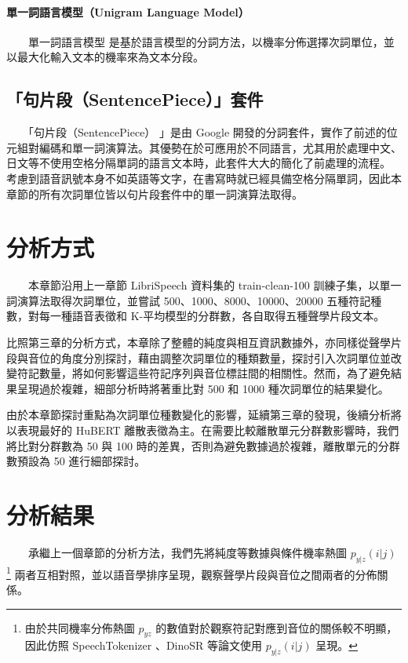 \paragraph{單一詞語言模型（Unigram Language Model）} \hfill \break
%
　　單一詞語言模型 \cite{kudo2018subword} 是基於語言模型的分詞方法，以機率分佈選擇次詞單位，並以最大化輸入文本的機率來為文本分段。

\subsection{「句片段（SentencePiece）」套件}

　　「句片段（SentencePiece） \cite{kudo_sentencepiece_2018}
」是由 Google 開發的分詞套件，實作了前述的位元組對編碼和單一詞演算法。其優勢在於可應用於不同語言，尤其用於處理中文、日文等不使用空格分隔單詞的語言文本時，此套件大大的簡化了前處理的流程。
        考慮到語音訊號本身不如英語等文字，在書寫時就已經具備空格分隔單詞，因此本章節的所有次詞單位皆以句片段套件中的單一詞演算法取得。

\section{分析方式}

　　本章節沿用上一章節 LibriSpeech 資料集的 train-clean-100 訓練子集，以單一詞演算法取得次詞單位，並嘗試 500、1000、8000、10000、20000 五種符記種數，對每一種語音表徵和 K-平均模型的分群數，各自取得五種聲學片段文本。

        比照第三章的分析方式，本章除了整體的純度與相互資訊數據外，亦同樣從聲學片段與音位的角度分別探討，藉由調整次詞單位的種類數量，探討引入次詞單位並改變符記數量，將如何影響這些符記序列與音位標註間的相關性。然而，為了避免結果呈現過於複雜，細部分析時將著重比對 500 和 1000 種次詞單位的結果變化。

        由於本章節探討重點為次詞單位種數變化的影響，延續第三章的發現，後續分析將以表現最好的 HuBERT 離散表徵為主。在需要比較離散單元分群數影響時，我們將比對分群數為 50 與 100 時的差異，否則為避免數據過於複雜，離散單元的分群數預設為 50 進行細部探討。

\section{分析結果} 

　　承繼上一個章節的分析方法，我們先將純度等數據與條件機率熱圖 $p_{y|z}(i | j)$ \footnote{由於共同機率分佈熱圖 $p_{yz}$ 的數值對於觀察符記對應到音位的關係較不明顯，因此仿照 SpeechTokenizer \cite{zhang2024speechtokenizer}、DinoSR \cite{liu2024dinosr} 等論文使用 $p_{y|z}(i | j)$ 呈現。} 兩者互相對照，並以語音學排序呈現，觀察聲學片段與音位之間兩者的分佈關係。


